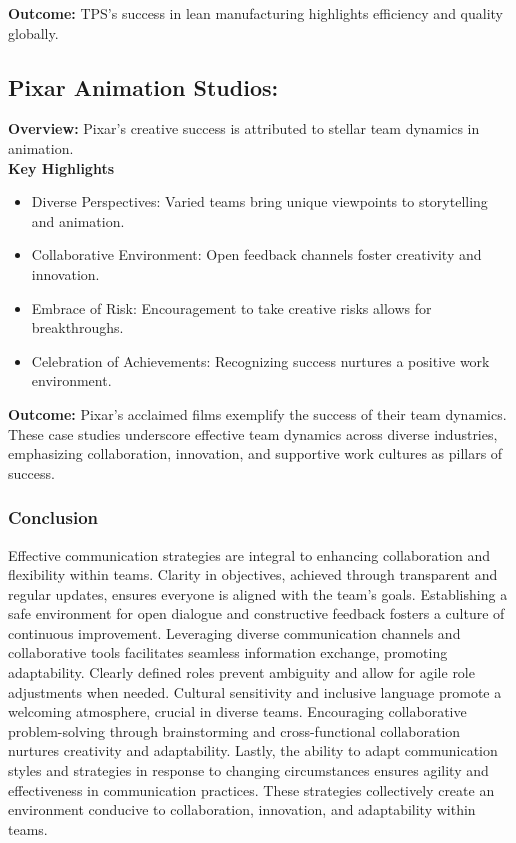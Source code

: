 \documentclass[a4paper, twoside]{article}
\begin{document}
\textbf{Outcome:} TPS's success in lean manufacturing highlights efficiency and quality globally.

\subsection*{Pixar Animation Studios:}

\textbf{Overview:} Pixar's creative success is attributed to stellar team dynamics in animation.\\

\textbf{Key Highlights}
\begin{itemize}
    \item Diverse Perspectives: Varied teams bring unique viewpoints to storytelling and animation.
    \item Collaborative Environment: Open feedback channels foster creativity and innovation.
    \item Embrace of Risk: Encouragement to take creative risks allows for breakthroughs.
    \item Celebration of Achievements: Recognizing success nurtures a positive work environment.
\end{itemize}

\textbf{Outcome:} Pixar's acclaimed films exemplify the success of their team dynamics. These case studies underscore effective team dynamics across diverse industries, emphasizing collaboration, innovation, and supportive work cultures as pillars of success.


\subsubsection{Conclusion}
Effective communication strategies are integral to enhancing collaboration and flexibility within teams. Clarity in objectives, achieved through transparent and regular updates, ensures everyone is aligned with the team's goals. Establishing a safe environment for open dialogue and constructive feedback fosters a culture of continuous improvement. Leveraging diverse communication channels and collaborative tools facilitates seamless information exchange, promoting adaptability. Clearly defined roles prevent ambiguity and allow for agile role adjustments when needed. Cultural sensitivity and inclusive language promote a welcoming atmosphere, crucial in diverse teams. Encouraging collaborative problem-solving through brainstorming and cross-functional collaboration nurtures creativity and adaptability. Lastly, the ability to adapt communication styles and strategies in response to changing circumstances ensures agility and effectiveness in communication practices. These strategies collectively create an environment conducive to collaboration, innovation, and adaptability within teams.
\end{document}
